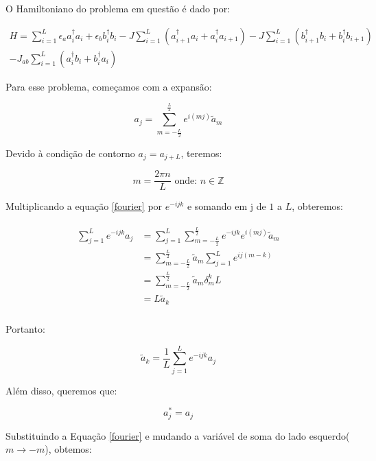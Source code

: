 O Hamiltoniano do problema em questão é dado por:

\begin{multline}
H = \sum_{i=1}^{L} \epsilon_a a_{i}^\dagger a_{i} + \epsilon_b b_{i}^\dagger b_{i} - J \sum_{i=1}^{L} (a_{i+1}^\dagger a_i + a_{i}^\dagger a_{i+1}) - J \sum_{i=1}^{L} (b_{i+1}^\dagger b_i + b_{i}^\dagger b_{i+1}) \\ - J_{ab} \sum_{i=1}^{L} (a_i^\dagger b_i + b_i^\dagger a_i)
\label{ham}
\end{multline}

Para esse problema, começamos com a expansão:

\begin{equation}
a_j = \sum_{m=-\frac{L}{2}}^{\frac{L}{2}} e^{i(mj)} \tilde{a}_m
\label{fourier}
\end{equation}

Devido à condição de contorno $a_j=a_{j+L}$, teremos:

\begin{equation}
m = \frac{2 \pi n}{L} \text{ onde: } n \in \mathbb{Z}
\end{equation}

Multiplicando a equação \eqref{fourier} por $e^{-ijk}$ e somando em j de $1$ a $L$, obteremos:


\begin{align}
\begin{split}
\sum_{j=1}^{L} e^{-ijk} a_j &= \sum_{j=1}^{L} \sum_{m=-\frac{L}{2}}^{\frac{L}{2}} e^{-ijk} e^{i(mj)} \tilde{a}_m \\
&= \sum_{m=-\frac{L}{2}}^{\frac{L}{2}} \tilde{a}_m \sum_{j=1}^{L} e^{ij(m-k)} \\
&= \sum_{m=-\frac{L}{2}}^{\frac{L}{2}} \tilde{a}_m \delta_{m}^{k} L \\
&= L \tilde{a}_k \\
\end{split}
\end{align}

Portanto:

\begin{equation}
\tilde{a}_k = \frac{1}{L} \sum_{j=1}^{L} e^{-ijk} a_j
\end{equation}

Além disso, queremos que:

\begin{equation}
a_{j}^* = a_{j}
\end{equation}

Substituindo a Equação \eqref{fourier} e mudando a variável de soma do lado esquerdo($m \rightarrow -m$), obtemos:

